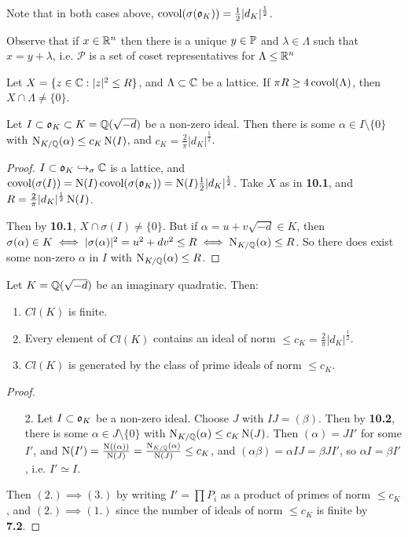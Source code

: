 \documentclass[10pt,a4paper]{article}
\begin{document}
Note that in both cases above, $\covol(\sigma(\o_K)) = \frac12|d_K|^{\frac12}$.

Observe that if $x \in \R^n$ then there is a unique $y \in \P$ and $\lambda \in \Lambda$ such that $x = y +\lambda$, i.e. $\mathcal{P}$ is a set of coset representatives for $\Lambda \leq \R^n$

\begin{theorem}
Let $X = \{z \in \C : |z|^2 \leq R\}$, and $\Lambda \subset \C$ be a lattice. If $\pi R \geq 4 \covol(\Lambda)$, then $X \cap \Lambda \neq \{0\}$.
\end{theorem}
\begin{theorem}
Let $I \subset \o_K \subset K = \Q(\sqrt{-d})$ be a non-zero ideal. Then there is some $\alpha \in I\setminus\{0\}$ with $\Nn_{K/\Q}(\alpha)\leq c_K \Nn(I)$, and $c_K = \frac{2}{\pi}|d_K|^{\frac12}$.
\end{theorem}
\begin{proof}
$I \subset \o_K \injection_\sigma \C$ is a lattice, and $\covol(\sigma(I)) = \Nn(I)\covol(\sigma(\o_K)) = \Nn(I)\frac{1}{2}|d_K|^{\frac12}$. Take $X$ as in \textbf{10.1}, and $R = \frac{2}{\pi}|d_K|^{\frac12}\Nn(I)$.

Then by \textbf{10.1}, $X \cap \sigma(I) \neq \{0\}$. But if $\alpha = u +v\sqrt{-d} \in K$, then $\sigma(\alpha) \in K \iff |\sigma(\alpha)|^2 = u^2+dv^2 \leq R \iff \Nn_{K/\Q}(\alpha) \leq R$. So there does exist some non-zero $\alpha$ in $I$ with $\Nn_{K/\Q}(\alpha) \leq R$.
\end{proof}

\begin{corollary}
Let $K = \Q(\sqrt{-d})$ be an imaginary quadratic. Then:
\begin{enumerate}
\item $Cl(K)$ is finite.
\item Every element of $Cl(K)$ contains an ideal of norm $\leq c_K = \frac{2}{\pi}|d_K|^{\frac12}$.
\item $Cl(K)$ is generated by the class of prime ideals of norm $\leq c_K$.
\end{enumerate}
\end{corollary}
\begin{proof}
\begin{itemize}
\item[2.] Let $I \subset \o_K$ be a non-zero ideal. Choose $J$ with $IJ = (\beta)$. Then by \textbf{10.2}, there is some $\alpha \in J \setminus \{0\}$ with $\Nn_{K/\Q}(\alpha) \leq c_K \Nn(J)$. Then $(\alpha) = JI'$ for some $I'$, and $\Nn(I') = \frac{\Nn((\alpha))}{\Nn(J)} = \frac{\Nn_{K/\Q}(\alpha)}{\Nn(J)} \leq c_K$, and $(\alpha\beta) = \alpha IJ = \beta JI'$, so $\alpha I = \beta I'$, i.e. $I' \simeq I$.
\end{itemize}
Then $(2.)\implies(3.)$ by writing $I' = \prod P_i$ as a product of primes of norm $\leq c_K$, and $(2.)\implies(1.)$ since the number of ideals of norm $\leq c_K$ is finite by \textbf{7.2}.
\end{proof}
\end{document}

